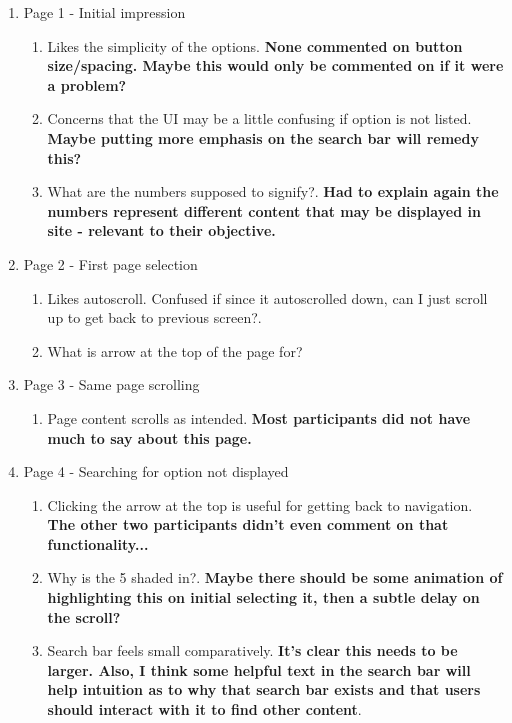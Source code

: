\begin{enumerate}
\item
  Page 1 - Initial impression
  \begin{enumerate}
  \item
    Likes the simplicity of the options\super{*}. \textbf{None commented on button size/spacing. Maybe this would only be commented on if it were a problem?}
  \item
    Concerns that the UI may be a little confusing if option is not listed. \textbf{Maybe putting more emphasis on the search bar will remedy this?}
  \item
    What are the numbers supposed to signify?. \textbf{Had to explain again the numbers represent different content that may be displayed in site - relevant to their objective.}
  \end{enumerate}
\item
  Page 2 - First page selection
  \begin{enumerate}
  \item
    Likes autoscroll\super{*}. Confused if since it autoscrolled down, can I just scroll up to get back to previous screen?.
  \item
    What is arrow at the top of the page for?
  \end{enumerate}
\item
  Page 3 - Same page scrolling
  \begin{enumerate}
  \item
    Page content scrolls as intended. \textbf{Most participants did not have much to say about this page.}
  \end{enumerate}
\item
  Page 4 - Searching for option not displayed
  \begin{enumerate}
  \item
    Clicking the arrow at the top is useful for getting back to navigation. \textbf{The other two participants didn't even comment on that functionality...}
  \item
    Why is the 5 shaded in?. \textbf{Maybe there should be some animation of highlighting this on initial selecting it, then a subtle delay on the scroll?}
  \item
    Search bar feels small comparatively. \textbf{It's clear this needs to be larger. Also, I think some helpful text in the search bar will help intuition as to why that search bar exists and that users should interact with it to find other content}.

\end{enumerate}
\end{enumerate}
